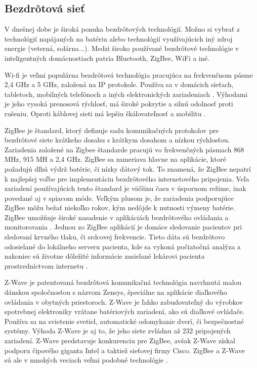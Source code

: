 \documentclass[twoside]{ctuthesis}
\theoremstyle{plain}
\theoremstyle{definition}
\theoremstyle{note}
\begin{document}
\subsection{Bezdrôtová sieť }

V dnešnej dobe je široká ponuka bezdrôtových technológií. Možno si vybrať z technológií napájaných na batériu alebo technológií využívajúcich iný zdroj energie (veterná, solárna...). Medzi široko používané bezdrôtové technológie v inteligentných domácnostiach patria Bluetooth, ZigBee, WiFi a iné.
\newline

Wi-fi je veľmi populárna bezdrôtová technológia pracujúca na frekvenčnom pásme 2,4 GHz a 5 GHz, založená na IP protokole. Používa sa v domácich sieťach, tabletoch, mobilných telefónoch a iných elektronických zariadeniach \cite{comunication}. Výhodami je jeho vysoká prenosová rýchlosť, má široké pokrytie a silnú odolnosť proti rušeniu. Oproti káblovej sieti má lepšiu škálovateľnosť a mobilitu \cite{wifi}.
\newline

ZigBee je štandard, ktorý definuje sadu komunikačných protokolov pre bezdrôtové siete krátkeho dosahu s krátkym dosahom a nízkou rýchlosťou. Zariadenia založené na Zigbee štandarde pracujú vo frekvenčných pásmach 868 MHz, 915 MH a 2,4 GHz.
ZigBee sa zameriava hlavne na aplikácie, ktoré požadujú dlhú výdrž batérie, či nízky dátový tok. To znamená, že ZigBee nepatrí k najlepšej voľbe pre implementáciu bezdrôtového internetového pripojenia. Veľa zariadení používajúcich tento štandard je väčšinu času v úspornom režime, inak povedané aj v spiacom móde. Veľkým plusom je, že zariadenia podporujúce ZigBee môžu bežať niekoľko rokov, kým nedôjde k nutnosti výmeny batérie. ZigBee umožňuje široké nasadenie v aplikáciách bezdrôtového ovládania a monitorovania \cite{zigbee}. Jednou zo ZigBee aplikácií je domáce sledovanie pacientov pri sledovaní krvného tlaku, či srdcovej frekvencie. Tieto dáta sú bezdrôtovo odosielané do lokálneho serveru pacienta, kde sa vykoná počiatočná analýza a nakoniec sú životne dôležité informácie zasielané lekárovi pacienta prostredníctvom internetu \cite{health}. 
\newline

Z-Wave je patentovaná bezdrôtová komunikačná technológia navrhnutá malou dánskou spoločnosťou s názvom Zensys, špeciálne na aplikácie diaľkového ovládania v obytných priestoroch. Z-Wave je ľahko zabudovateľný do výrobkov spotrebnej elektroniky vrátane batériových zariadení, ako sú diaľkové ovládače. Používa sa na svietenie svetiel, automatické odomykanie dverí, či bezpečnostné systémy. Výhoda Z-Wave je aj to, že jeho siete zvládnu až 232 pripojených zariadení. Z-Wave predstavuje konkurenciu pre ZigBee, avšak Z-Wave získal podporu čipového giganta Intel a taktiež sieťovej firmy Cisco. ZigBee a Z-Wave sú ale v mnohých veciach veľmi podobné technológie \cite{z-wave}. 
\newline
\end{document}
